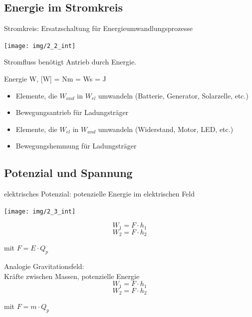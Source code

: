 \subsection{Energie im Stromkreis}

Stromkreis: Ersatzschaltung für Energieumwandlungsprozesse

\begin{minipage}{0.8\textwidth}
\texttt{[image: img/2\_2\_int]}	
\end{minipage} \hfill
\begin{minipage}{0.2\textwidth}
\Ra Stromfluss benötigt Antrieb durch Energie.
\end{minipage}

Energie W, [W] = Nm = Ws = J

\begin{itemize}
	\item Elemente, die $W_{and}$ in $W_{el}$ umwandeln (Batterie, Generator, Solarzelle, etc.)
	\item Bewegungsantrieb für Ladungsträger
\end{itemize}

\begin{itemize}
	\item Elemente, die $W_{el}$ in $W_{and}$ umwandeln (Widerstand, Motor, LED, etc.)
	\item Bewegungshemmung für Ladungsträger
\end{itemize}

\subsection{Potenzial und Spannung}

elektrisches Potenzial: potenzielle Energie im elektrischen Feld

\begin{center}
\texttt{[image: img/2\_3\_int]}
\end{center}

\begin{minipage}{0.5\textwidth}
	\vspace{1.2cm}
	$$W_1 = F \cdot h_1$$
	$$W_2 = F \cdot h_2$$
	\begin{center}
		mit $F = E \cdot Q_p$
	\end{center}
\end{minipage} \hfill
\begin{minipage}{0.5\textwidth}
	Analogie Gravitationsfeld:\\
	Kräfte zwischen Massen, potenzielle Energie
	$$W_1 = F \cdot h_1$$
	$$W_2 = F \cdot h_2$$
	\begin{center}
		mit $F = m \cdot Q_p$
	\end{center}
\end{minipage}

